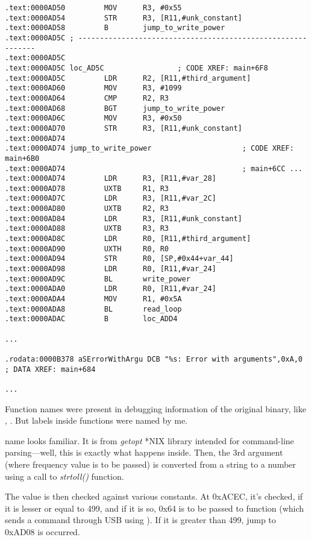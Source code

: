 \begin{lstlisting}[style=customasmARM]
.text:0000AD50         MOV      R3, #0x55
.text:0000AD54         STR      R3, [R11,#unk_constant]
.text:0000AD58         B        jump_to_write_power
.text:0000AD5C ; ------------------------------------------------------------
.text:0000AD5C
.text:0000AD5C loc_AD5C                 ; CODE XREF: main+6F8
.text:0000AD5C         LDR      R2, [R11,#third_argument]
.text:0000AD60         MOV      R3, #1099
.text:0000AD64         CMP      R2, R3
.text:0000AD68         BGT      jump_to_write_power
.text:0000AD6C         MOV      R3, #0x50
.text:0000AD70         STR      R3, [R11,#unk_constant]
.text:0000AD74
.text:0000AD74 jump_to_write_power                     ; CODE XREF: main+6B0
.text:0000AD74                                         ; main+6CC ...
.text:0000AD74         LDR      R3, [R11,#var_28]
.text:0000AD78         UXTB     R1, R3
.text:0000AD7C         LDR      R3, [R11,#var_2C]
.text:0000AD80         UXTB     R2, R3
.text:0000AD84         LDR      R3, [R11,#unk_constant]
.text:0000AD88         UXTB     R3, R3
.text:0000AD8C         LDR      R0, [R11,#third_argument]
.text:0000AD90         UXTH     R0, R0
.text:0000AD94         STR      R0, [SP,#0x44+var_44]
.text:0000AD98         LDR      R0, [R11,#var_24]
.text:0000AD9C         BL       write_power
.text:0000ADA0         LDR      R0, [R11,#var_24]
.text:0000ADA4         MOV      R1, #0x5A
.text:0000ADA8         BL       read_loop
.text:0000ADAC         B        loc_ADD4

...

.rodata:0000B378 aSErrorWithArgu DCB "%s: Error with arguments",0xA,0 ; DATA XREF: main+684

...

\end{lstlisting}

Function names were present in debugging information of the original binary, like , .
But labels inside functions were named by me.

 name looks familiar. It is from \emph{getopt} *NIX library intended for command-line parsing---well,
this is exactly what happens inside.
Then, the 3rd argument (where frequency value is to be passed) is converted from a string to a number using
a call to \emph{strtoll()} function.

The value is then checked against various constants.
At 0xACEC, it's checked, if it is lesser or equal to 499, and if it is so,
0x64 is to be passed to  function (which sends a command through USB using ).
If it is greater than 499, jump to 0xAD08 is occurred.

